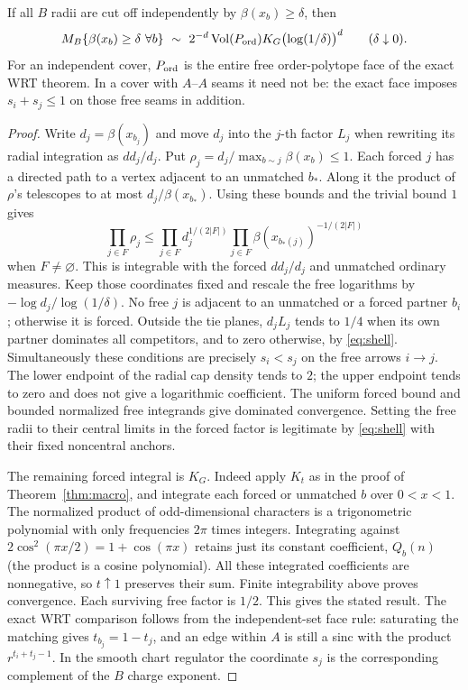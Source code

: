 \begin{proposition}\label{prop:reg}
If all \(B\) radii are cut off independently by \(\beta(x_b)\ge\delta\), then
\[
 M_B\{\beta(x_b)\ge\delta\ \forall b\}
 \ \sim\ 2^{-d}\operatorname{Vol}(P_{\rm ord})K_G\bigl(\log(1/\delta)\bigr)^d
 \qquad(\delta\downarrow0).
\]
For an independent cover, \(P_{\rm ord}\) is the entire free order-polytope face of the exact WRT theorem. In a cover with \(A\)--\(A\) seams it need not be: the exact face imposes \(s_i+s_j\le1\) on those free seams in addition.
\end{proposition}
\begin{proof}
Write \(d_j=\beta(x_{b_j})\) and move \(d_j\) into the \(j\)-th factor \(L_j\) when rewriting its radial integration as \(dd_j/d_j\). Put \(\rho_j=d_j/\max_{b\sim j}\beta(x_b)\le1\). Each forced \(j\) has a directed path to a vertex adjacent to an unmatched \(b_*\). Along it the product of \(\rho\)'s telescopes to at most \(d_j/\beta(x_{b_*})\). Using these bounds and the trivial bound \(1\) gives
\[
 \prod_{j\in F}\rho_j\le
 \prod_{j\in F}d_j^{1/(2|F|)}
 \prod_{j\in F}\beta(x_{b_*(j)})^{-1/(2|F|)}
\]
when \(F\ne\varnothing\). This is integrable with the forced \(dd_j/d_j\) and unmatched ordinary measures. Keep those coordinates fixed and rescale the free logarithms by \(-\log d_j/\log(1/\delta)\). No free \(j\) is adjacent to an unmatched or a forced partner \(b_i\); otherwise it is forced. Outside the tie planes, \(d_jL_j\) tends to \(1/4\) when its own partner dominates all competitors, and to zero otherwise, by \eqref{eq:shell}. Simultaneously these conditions are precisely \(s_i<s_j\) on the free arrows \(i\to j\). The lower endpoint of the radial cap density tends to \(2\); the upper endpoint tends to zero and does not give a logarithmic coefficient. The uniform forced bound and bounded normalized free integrands give dominated convergence. Setting the free radii to their central limits in the forced factor is legitimate by \eqref{eq:shell} with their fixed noncentral anchors.

The remaining forced integral is \(K_G\). Indeed apply \(K_t\) as in the proof of Theorem~\ref{thm:macro}, and integrate each forced or unmatched \(b\) over \(0<x<1\). The normalized product of odd-dimensional characters is a trigonometric polynomial with only frequencies \(2\pi\) times integers. Integrating against \(2\cos^2(\pi x/2)=1+\cos(\pi x)\) retains just its constant coefficient, \(Q_b(n)\) (the product is a cosine polynomial). All these integrated coefficients are nonnegative, so \(t\uparrow1\) preserves their sum. Finite integrability above proves convergence. Each surviving free factor is \(1/2\). This gives the stated result. The exact WRT comparison follows from the independent-set face rule: saturating the matching gives \(t_{b_j}=1-t_j\), and an edge within \(A\) is still a sinc with the product \(r^{t_i+t_j-1}\). In the smooth chart regulator the coordinate \(s_j\) is the corresponding complement of the \(B\) charge exponent.
\end{proof}

